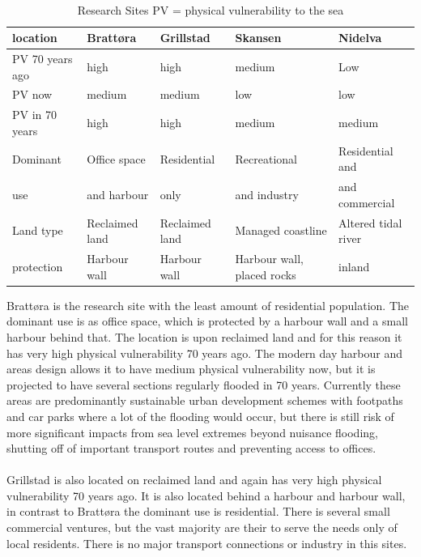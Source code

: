 \paragraph{}
\begin{table}[!ht]
    \centering
    \begin{tabular}{|l|l|l|l|l|}
    \hline
        location & Brattøra & Grillstad & Skansen  & Nidelva \\ \hline
        PV 70 years ago & high & high & medium & Low \\ \hline
        PV now &  medium &  medium &  low &  low \\ \hline
        PV in 70 years &  high &  high &  medium &  medium \\ \hline
        Dominant & Office space  & Residential & Recreational  & Residential and \\ \newline
        use & and harbour &  only   &  and industry & and commercial  \\ \hline
        Land type & Reclaimed land & Reclaimed land & Managed coastline  & Altered tidal river \\ \hline
        protection & Harbour wall & Harbour wall & Harbour wall, placed rocks & inland \\ \hline
    \end{tabular}
    \caption{Research Sites PV = physical vulnerability to the sea}
    \label{table:research-sites}
\end{table}

Brattøra is the research site with the least amount of residential population. The dominant use is as office space, which is protected by a harbour wall and a small harbour behind that. The location is upon reclaimed land and for this reason it has very high physical vulnerability 70 years ago. The modern day harbour and areas design allows it to have medium physical vulnerability now, but it is projected to have several sections regularly flooded in 70 years. Currently these areas are predominantly sustainable urban development schemes with footpaths and car parks where a lot of the flooding would occur, but there is still risk of more significant impacts from sea level extremes beyond nuisance flooding, shutting off of important transport routes and preventing access to offices.
\paragraph{}
Grillstad is also located on reclaimed land and again has very high physical vulnerability 70 years ago. It is also located behind a harbour and harbour wall, in contrast to  Brattøra the dominant use is residential. There is several small commercial ventures, but the vast majority are their to serve the needs only of local residents. There is no major transport connections or industry in this sites. 
